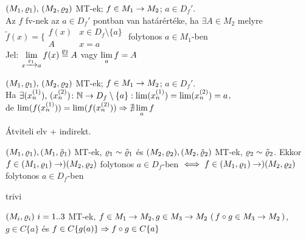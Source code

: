 \begin{de}[Határérték]
  $(M_1,\varrho_1),\,(M_2,\varrho_2)$ MT-ek; $f\in M_1\to M_2$; $a\in
  D_f'$.\\
  Az $f$ fv-nek az $a\in D_f'$ pontban van határértéke, ha
  $\exists  A \in M_2$ melyre\\
  $\tilde{f}(x) = \Big\{\begin{array}{cc}
  f(x) & x\in D_f\setminus\{a\}\\
  A & x=a\end{array}$ folytonos $a\in M_1$-ben\\
  Jel: $\displaystyle\lim_{x\xrightarrow{\varrho_1}a}f(x) \stackrel{\varrho_2}{=} A$
  vagy $\displaystyle\lim_af=A$    
\end{de}


\begin{te} $(M_1,\varrho_1),\,(M_2,\varrho_2)$ MT-ek; $f\in M_1\to M_2$; $a\in
  D_f'$.\\Ha $\exists (x_n^{(1)}),\,(x_n^{(2)})\colon \mathbb{N}\to
  D_f\setminus\{a\}:  \lim(x_n^{(1)})=\lim(x_n^{(2)}) = a$,\\ de
  $\lim(f(x_n^{(1)}))=\lim(f(x_n^{(2)})) \Rightarrow \nexists \displaystyle\lim_af$
\end{te}
\begin{biz}
  Átviteli elv + indirekt.
\end{biz}

\begin{te}
  $(M_1,\varrho_1),(M_1,\tilde{\varrho}_1)$ MT-ek, $\varrho_1\sim\tilde{\varrho}_1$ és
  $(M_2,\varrho_2),(M_2,\tilde{\varrho}_2)$ MT-ek,
  $\varrho_2\sim\tilde{\varrho}_2$. Ekkor
  $f\in (M_1,\varrho_1)\to)(M_2,\varrho_2)$ folytonos $a\in D_f$-ben $\iff
  f\in (M_1,\varrho_1)\to)(M_2,\varrho_2)$ folytonos $a\in D_f$-ben
\end{te}
\begin{biz}
  trivi
\end{biz}

\begin{te} $(M_i,\varrho_i)\ i=1..3$ MT-ek,
  $f\in M_1\to M_2,\\g\in M_3\to M_2 \ (\,f\circ g\in M_3\to M_2\,)$,
  $g\in C\{a\}$ és $f\in C\{g(a)\}\Rightarrow f\circ g\in C\{a\}$    
\end{te}

